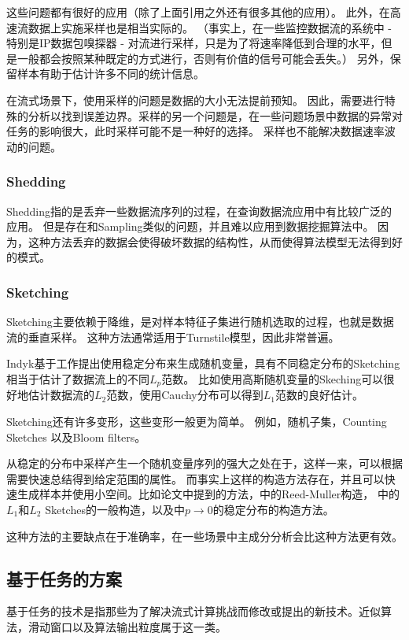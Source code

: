 这些问题都有很好的应用（除了上面引用之外还有很多其他的应用）。
此外，在高速流数据上实施采样也是相当实际的。 
（事实上，在一些监控数据流的系统中 - 特别是IP数据包嗅探器 - 
对流进行采样，只是为了将速率降低到合理的水平，但是一般都会按照某种既定的方式进行，否则有价值的信号可能会丢失。）
另外，保留样本有助于估计许多不同的统计信息。

在流式场景下，使用采样的问题是数据的大小无法提前预知。
因此，需要进行特殊的分析以找到误差边界。采样的另一个问题是，在一些问题场景中数据的异常对任务的影响很大，此时采样可能不是一种好的选择。
采样也不能解决数据速率波动的问题。

\subsubsection{Shedding}
Shedding指的是丢弃一些数据流序列的过程，在查询数据流应用中有比较广泛的应用\cite{babcock2003load, tatbul2003load}。
但是存在和Sampling类似的问题，并且难以应用到数据挖掘算法中。
因为，这种方法丢弃的数据会使得破坏数据的结构性，从而使得算法模型无法得到好的模式。

\subsubsection{Sketching}
Sketching主要依赖于降维，是对样本特征子集进行随机选取的过程，也就是数据流的垂直采样。
这种方法通常适用于Turnstile模型，因此非常普遍。

Indyk\cite{indyk2000stable}基于工作\cite{alon1996space}提出使用稳定分布来生成随机变量，具有不同稳定分布的Sketching相当于估计了数据流上的不同$L_p$范数。
比如使用高斯随机变量的Skeching可以很好地估计数据流的$L_2$范数，使用Cauchy分布可以得到$L_1$范数的良好估计。

Sketching还有许多变形，这些变形一般更为简单。 例如，随机子集\cite{gilbert2001surfing}，Counting Sketches\cite{charikar2002finding}
以及Bloom filters\cite{broder2004network}。


从稳定的分布中采样产生一个随机变量序列的强大之处在于，这样一来，可以根据需要快速总结得到给定范围的属性。
而事实上这样的构造方法存在，并且可以快速生成样本并使用小空间。比如\cite{feigenbaum2002approximate}论文中提到的方法，\cite{gilbert2001surfing}中的Reed-Muller构造，
\cite{gilbert2002fast}中的$L_1$和$L_2$ Sketches的一般构造，以及\cite{cormode2003estimating}中$p\rightarrow0$的稳定分布的构造方法。

这种方法的主要缺点在于准确率，在一些场景中主成分分析会比这种方法更有效。

\subsection{基于任务的方案}
基于任务的技术是指那些为了解决流式计算挑战而修改或提出的新技术。近似算法，滑动窗口以及算法输出粒度属于这一类。

